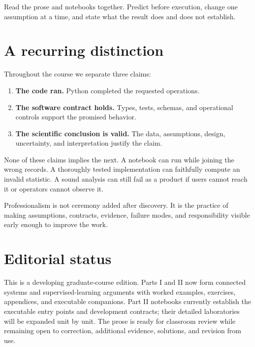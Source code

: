 Read the prose and notebooks together. Predict before execution, change one
assumption at a time, and state what the result does and does not establish.

\section*{A recurring distinction}

Throughout the course we separate three claims:

\begin{enumerate}
  \item \textbf{The code ran.} Python completed the requested operations.
  \item \textbf{The software contract holds.} Types, tests, schemas, and
  operational controls support the promised behavior.
  \item \textbf{The scientific conclusion is valid.} The data, assumptions,
  design, uncertainty, and interpretation justify the claim.
\end{enumerate}

None of these claims implies the next. A notebook can run while joining the
wrong records. A thoroughly tested implementation can faithfully compute an
invalid statistic. A sound analysis can still fail as a product if users cannot
reach it or operators cannot observe it.

\begin{professionalbox}
Professionalism is not ceremony added after discovery. It is the practice of
making assumptions, contracts, evidence, failure modes, and responsibility
visible early enough to improve the work.
\end{professionalbox}

\section*{Editorial status}

This is a developing graduate-course edition. Parts I and II now form connected
systems and supervised-learning arguments with worked examples, exercises,
appendices, and executable companions. Part II notebooks currently establish
the executable entry points and development contracts; their detailed
laboratories will be expanded unit by unit. The prose is ready for classroom
review while remaining open to correction, additional evidence, solutions, and
revision from use.
